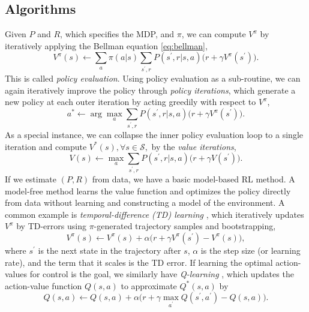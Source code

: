 \documentclass{article}
\begin{document}
\subsection{Algorithms}
Given $P$ and $R$, which specifies the MDP, and $\pi$, we can compute $V^\pi$ by iteratively applying the Bellman equation \eqref{eq:bellman},
\begin{equation}
    V^\pi(s)\leftarrow \sum_a\pi(a|s)\sum_{s^\prime,r}P(s^\prime,r|s,a)\bigg(r+\gamma V^\pi(s^\prime)\bigg).
\end{equation}
This is called \emph{policy evaluation}. Using policy evaluation as a sub-routine, we can again iteratively improve the policy through \emph{policy iterations}, which generate a new policy at each outer iteration by acting greedily with respect to $V^\pi$,
\begin{equation}
    a^* \leftarrow \arg\max_a \sum_{s^\prime,r}P(s^\prime,r|s,a)\bigg(r+\gamma V^\pi(s^\prime)\bigg).
\end{equation}
As a special instance, we can collapse the inner policy evaluation loop to a single iteration and compute $V^*(s), \forall s \in \mathcal{S},$ by the \emph{value iterations}, 
\begin{equation}
    V(s)\leftarrow \max_a \sum_{s^\prime,r}P(s^\prime,r|s,a)\bigg(r+\gamma V(s^\prime)\bigg).
\end{equation}
If we estimate $(P,R)$ from data, we have a basic model-based RL method. A model-free method learns the value function and optimizes the policy directly from data without learning and constructing a model of the environment.
A common example is \emph{temporal-difference (TD) learning} \citep{sutton1988learning}, which iteratively updates $V^\pi$ by TD-errors using $\pi$-generated trajectory samples and bootstrapping, 
\begin{equation}\label{eq:td-learning}
    V^\pi(s) \leftarrow V^\pi(s) + \alpha\bigg(r + \gamma V^\pi(s^\prime) - V^\pi(s)\bigg),
\end{equation}
where $s^\prime$ is the next state in the trajectory after $s$, $\alpha$ is the step size (or learning rate), and the term that it scales is the TD error.
If learning the optimal action-values for control is the goal, we similarly have \emph{Q-learning} \citep{watkins1992q}, which updates the action-value function $Q(s,a)$ to approximate $Q^*(s,a)$ by 
\begin{equation}
    Q(s,a) \leftarrow Q(s,a) + \alpha\bigg(r + \gamma\max_{a^\prime} Q(s^\prime,a^\prime) - Q(s,a)\bigg).
\end{equation}
\end{document}
